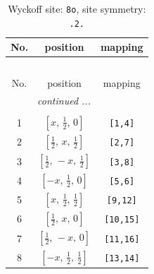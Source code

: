 \documentclass[fleqn,8pt]{jsarticle}
\begin{document}
\begin{longtable}{ccc}
\caption{Wyckoff site: {\tt 8o}, site symmetry: {\tt .2.}}
 \\
 \hline \hline
No. & position & mapping \\ \hline \endfirsthead

\multicolumn{2}{l}{\tablename\ \thetable{}} \\
 \hline \hline
No. & position & mapping \\ \hline \endhead

 \hline \hline
\multicolumn{2}{r}{\footnotesize\it continued ...} \\ \endfoot

 \hline \hline
\multicolumn{2}{r}{} \\ \endlastfoot

1 & $\left[ x,\, \frac{1}{2},\, 0 \right]$ & {\tt [1,4]} \\ \hline
2 & $\left[ \frac{1}{2},\, x,\, \frac{1}{2} \right]$ & {\tt [2,7]} \\ \hline
3 & $\left[ \frac{1}{2},\, - x,\, \frac{1}{2} \right]$ & {\tt [3,8]} \\ \hline
4 & $\left[ - x,\, \frac{1}{2},\, 0 \right]$ & {\tt [5,6]} \\ \hline
5 & $\left[ x,\, \frac{1}{2},\, \frac{1}{2} \right]$ & {\tt [9,12]} \\ \hline
6 & $\left[ \frac{1}{2},\, x,\, 0 \right]$ & {\tt [10,15]} \\ \hline
7 & $\left[ \frac{1}{2},\, - x,\, 0 \right]$ & {\tt [11,16]} \\ \hline
8 & $\left[ - x,\, \frac{1}{2},\, \frac{1}{2} \right]$ & {\tt [13,14]} \\
\end{longtable}
\renewcommand{\arraystretch}{1.2}
\end{document}
